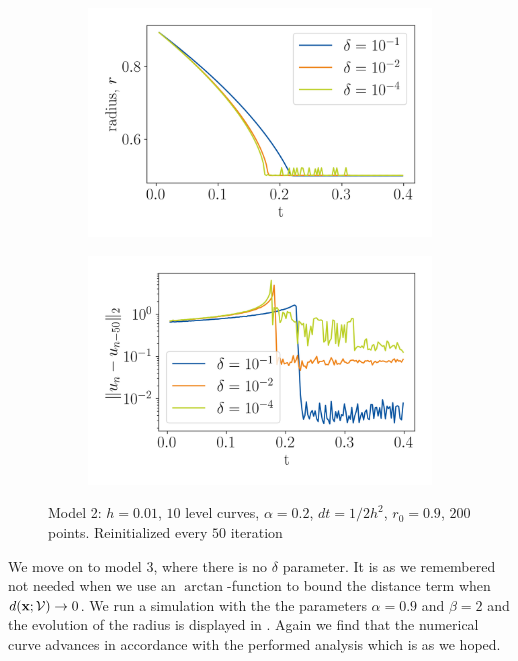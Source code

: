 \begin{figure}
    \centering
    \begin{subfigure}[h]{0.49\textwidth}
        \centering
        \includegraphics[width=\linewidth]{figures/Results/Circle/model2/d1_d2_d4_rad.png}
    \end{subfigure}%
    \begin{subfigure}[h]{0.49\textwidth}
        \centering
        \includegraphics[width=\linewidth]{figures/Results/Circle/model2/d1_d2_d4_res.png}
    \end{subfigure}
    \caption[Model 2 - Circular example, $\delta$ parameter]{Model 2: $h=0.01$, $10$ level curves, $\alpha=0.2$, $dt=1/2 h^2$, $r_0=0.9$, $200$ points. Reinitialized every $50$ iteration}
    \label{fig:model2-circle-deltas}
\end{figure}


We move on to model 3, where there is no $\delta$ parameter. It is as we remembered not needed when we use an $\arctan$-function to bound the distance term when $d(\textbf{x};\mathcal{V})\to 0$. We run a simulation with the the parameters $\alpha=0.9$ and $\beta=2$ and the evolution of the radius is displayed in . Again we find that the numerical curve advances in accordance with the performed analysis which is as we hoped.

